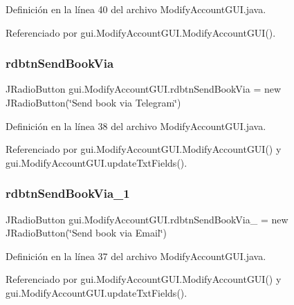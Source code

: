 Definición en la línea 40 del archivo Modify\+Account\+G\+U\+I.\+java.



Referenciado por gui.\+Modify\+Account\+G\+U\+I.\+Modify\+Account\+G\+U\+I().

\mbox{\label{classgui_1_1_modify_account_g_u_i_a77129e74749dc0b350d05de4f5137c52}} 
\subsubsection{\texorpdfstring{rdbtnSendBookVia}{rdbtnSendBookVia}}
{\footnotesize\ttfamily J\+Radio\+Button gui.\+Modify\+Account\+G\+U\+I.\+rdbtn\+Send\+Book\+Via = new J\+Radio\+Button(\char`\"{}Send book via Telegram\char`\"{})\hspace{0.3cm}{\ttfamily [private]}}



Definición en la línea 38 del archivo Modify\+Account\+G\+U\+I.\+java.



Referenciado por gui.\+Modify\+Account\+G\+U\+I.\+Modify\+Account\+G\+U\+I() y gui.\+Modify\+Account\+G\+U\+I.\+update\+Txt\+Fields().

\mbox{\label{classgui_1_1_modify_account_g_u_i_aa53f8e44219679688600395a16df9c1f}} 
\subsubsection{\texorpdfstring{rdbtnSendBookVia\_1}{rdbtnSendBookVia\_1}}
{\footnotesize\ttfamily J\+Radio\+Button gui.\+Modify\+Account\+G\+U\+I.\+rdbtn\+Send\+Book\+Via\+\_ = new J\+Radio\+Button(\char`\"{}Send book via Email\char`\"{})\hspace{0.3cm}{\ttfamily [private]}}



Definición en la línea 37 del archivo Modify\+Account\+G\+U\+I.\+java.



Referenciado por gui.\+Modify\+Account\+G\+U\+I.\+Modify\+Account\+G\+U\+I() y gui.\+Modify\+Account\+G\+U\+I.\+update\+Txt\+Fields().

